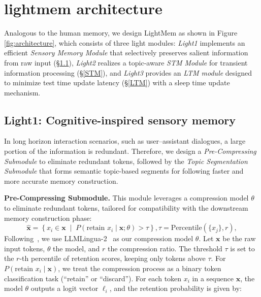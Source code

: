 \section{lightmem architecture}
\label{sec:method}
Analogous to the human memory, we design LightMem as shown in Figure \ref{fig:architecture}, which consists of three light modules:
\textit{Light1} implements an efficient \textit{Sensory Memory Module} that selectively preserves salient information from raw input (\S\ref{pre_compress}),
\textit{Light2} realizes a topic-aware \textit{STM Module} for transient information processing (\S\ref{STM}),
and \textit{Light3} provides an \textit{LTM module} designed to minimize test time update latency (\S\ref{LTM}) with a sleep time update mechanism. 

\subsection{Light1: Cognitive-inspired sensory memory}
\label{pre_compress}
In long horizon interaction scenarios, such as user–assistant dialogues, a large portion of the information is redundant. 
Therefore, we design a \textit{Pre-Compressing Submodule} to eliminate redundant tokens, followed by the \textit{Topic Segmentation Submodule} that forms semantic topic-based segments for following faster and more accurate memory construction. 


\noindent \textbf{Pre-Compressing Submodule.} This module leverages a compression model $\theta$ to eliminate redundant tokens, tailored for compatibility with the downstream memory construction phase: 
\[
\hat{\mathbf{x}} = \left\{ x_i \in \mathbf{x} \;\middle|\; P(\text{retain } x_i \mid \mathbf{x}; \theta) > \tau \right\}, 
\tau = \text{Percentile}\left( \{x_j\}, r \right),
\]
Following~\citet{xia2025tokenskip}, we use LLMLingua-2~\citep{pan2024llmlingua} as our compression model $\theta$. Let $\mathbf{x}$ be the raw input tokens, $\theta$ the model, and $r$ the compression ratio. The threshold $\tau$ is set to the $r$-th percentile of retention scores, keeping only tokens above $\tau$. 
For $P(\text{retain } x_i \mid \mathbf{x})$, we treat the compression process as a binary token classification task (``retain'' or ``discard''). For each token $x_i$ in a sequence $\mathbf{x}$, the model $\theta$ outputs a logit vector $\ell_i$, and the retention probability is given by:

